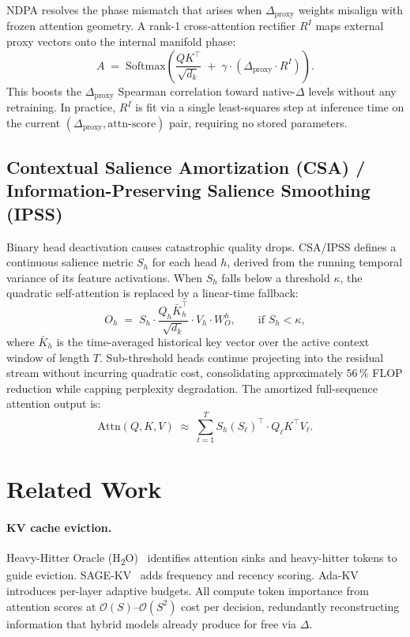 \documentclass[11pt]{article}
\newcommand{\dsig}{\Delta}
\newcommand{\proxydsig}{\ensuremath{\dsig_{\mathrm{proxy}}}}
\newcommand{\Order}{\mathcal{O}}
\begin{document}
NDPA resolves the phase mismatch that arises when $\proxydsig$ weights
misalign with frozen attention geometry. A rank-1 cross-attention rectifier
$R^{I}$ maps external proxy vectors onto the internal manifold phase:
\begin{equation}\label{eq:ndpa}
  A \;=\; \mathrm{Softmax}\!\left(\frac{QK^{\top}}{\sqrt{d_k}} \;+\; \gamma \cdot (\proxydsig \cdot R^{I})\right).
\end{equation}
This boosts the $\proxydsig$ Spearman correlation toward native-$\dsig$
levels without any retraining. In practice, $R^{I}$ is fit via a single
least-squares step at inference time on the current
$(\proxydsig, \mathrm{attn\text{-}score})$ pair, requiring no stored
parameters.

\subsection{Contextual Salience Amortization (CSA) / Information-Preserving Salience Smoothing (IPSS)}
Binary head deactivation causes catastrophic quality drops. CSA/IPSS defines
a continuous salience metric $S_h$ for each head $h$, derived from the
running temporal variance of its feature activations. When $S_h$ falls below
a threshold $\kappa$, the quadratic self-attention is replaced by a
linear-time fallback:
\begin{equation}\label{eq:ipss}
  O_h \;=\; S_h \cdot \frac{Q_h \bar{K}_h^{\top}}{\sqrt{d_k}} \cdot V_h \cdot W_O^{h},\qquad \text{if } S_h < \kappa,
\end{equation}
where $\bar{K}_h$ is the time-averaged historical key vector over the active
context window of length $T$. Sub-threshold heads continue projecting into
the residual stream without incurring quadratic cost, consolidating
approximately $56\,\%$ FLOP reduction while capping perplexity degradation.
The amortized full-sequence attention output is:
\begin{equation}
  \mathrm{Attn}(Q,K,V) \;\approx\; \sum_{t=1}^{T} S_h(S_\ell)^{\top} \cdot Q_\ell K^{\top} V_\ell.
\end{equation}

\section{Related Work}
\paragraph{KV cache eviction.}
Heavy-Hitter Oracle (H\textsubscript{2}O)~\cite{h2o} identifies attention sinks
and heavy-hitter tokens to guide eviction. SAGE-KV~\cite{sagekv} adds frequency
and recency scoring. Ada-KV~\cite{adakv} introduces per-layer adaptive budgets.
All compute token importance from attention scores at $\Order(S)$--$\Order(S^2)$
cost per decision, redundantly reconstructing information that hybrid models
already produce for free via $\dsig$.
\end{document}
